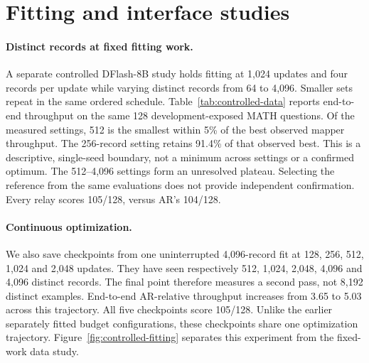 \documentclass{article}
\begin{document}
\begin{table}[H]
\caption{EAGLE-3 AR-paired code quality. Counts are passed tasks. The intervals resample paired tasks. Expanded tests reuse the same programs
and do not add independent samples.}
\label{tab:eagle-code-ar}
\centering\small
\setlength{\tabcolsep}{3pt}

\end{table}

\section{Fitting and interface studies}
\label{app:design}

\paragraph{Distinct records at fixed fitting work.}
A separate controlled DFlash-8B study holds fitting at 1,024 updates
and four records per update while varying distinct records from 64
to 4,096. Smaller sets repeat in the same ordered schedule.
Table~\ref{tab:controlled-data} reports end-to-end throughput on the
same 128 development-exposed MATH questions. Of the measured settings,
512 is the smallest within 5\% of the best observed mapper throughput.
The 256-record setting retains 91.4\% of that observed best. This is a
descriptive, single-seed boundary, not a minimum across settings or a
confirmed optimum. The 512--4,096 settings form an unresolved plateau. Selecting
the reference from the same evaluations does not provide independent
confirmation. Every relay scores 105/128, versus AR's 104/128.

\begin{table}[H]
\caption{Distinct-data study at 4,096 presentations for every row.
Native retention uses each run's paired native-drafter control.
Best retention uses the observed best relay across these settings.
All results condition on one fitting seed.}
\label{tab:controlled-data}
\centering\small
\setlength{\tabcolsep}{3pt}

\end{table}

\paragraph{Continuous optimization.}
We also save checkpoints from one uninterrupted 4,096-record fit at
128, 256, 512, 1,024 and 2,048 updates. They have seen respectively
512, 1,024, 2,048, 4,096 and 4,096 distinct records. The final point
therefore measures a second pass, not 8,192 distinct examples.
End-to-end AR-relative throughput increases from 3.65 to 5.03 across
this trajectory. All five checkpoints score 105/128. Unlike the earlier
separately fitted budget configurations, these checkpoints share one
optimization trajectory. Figure~\ref{fig:controlled-fitting} separates
this experiment from the fixed-work data study.
\end{document}
